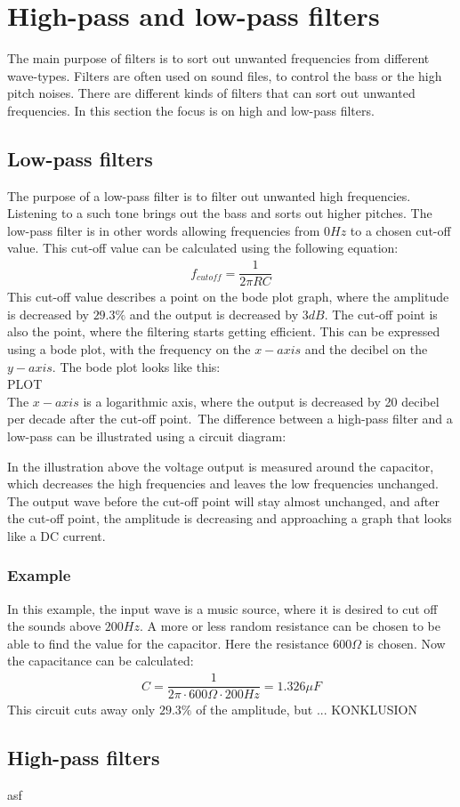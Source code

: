 \chapter{High-pass and low-pass filters}
The main purpose of filters is to sort out unwanted frequencies from different wave-types. Filters are often used on sound files, to control the bass or the high pitch noises. There are different kinds of filters that can sort out unwanted frequencies. In this section the focus is on high and low-pass filters.

\section{Low-pass filters}
The purpose of a low-pass filter is to filter out unwanted high frequencies. Listening to a such tone brings out the bass and sorts out higher pitches. The low-pass filter is in other words allowing frequencies from $0Hz$ to a chosen cut-off value. This cut-off value can be calculated using the following equation:
\begin{align*}
f_{cutoff}=\dfrac{1}{2 \pi RC}
\end{align*}
This cut-off value describes a point on the bode plot graph, where the amplitude is decreased by $29.3\%$ and the output is decreased by $3dB$. The cut-off point is also the point, where the filtering starts getting efficient. This can be expressed using a bode plot, with the frequency on the $x-axis$ and the decibel on the $y-axis$. The bode plot looks like this: \\
PLOT \\
The $x-axis$ is a logarithmic axis, where the output is decreased by 20 decibel per decade after the cut-off point.\
The difference between a high-pass filter and a low-pass can be illustrated using a circuit diagram:
\begin{figure}[H]
	
\end{figure}
In the illustration above the voltage output is measured around the capacitor, which decreases the high frequencies and leaves the low frequencies unchanged. The output wave before the cut-off point will stay almost unchanged, and after the cut-off point, the amplitude is decreasing and approaching a graph that looks like a DC current. 
\subsection{Example}
In this example, the input wave is a music source, where it is desired to cut off the sounds above $200Hz$. A more or less random resistance can be chosen to be able to find the value for the capacitor. Here the resistance $600 \Omega$ is chosen. Now the capacitance can be calculated:
\begin{align*}
C =\dfrac{1}{2 \pi \cdot 600 \Omega \cdot 200 Hz} = 1.326 \mu F
\end{align*}
This circuit cuts away only $29.3\%$ of the amplitude, but ... KONKLUSION
\section{High-pass filters}
asf